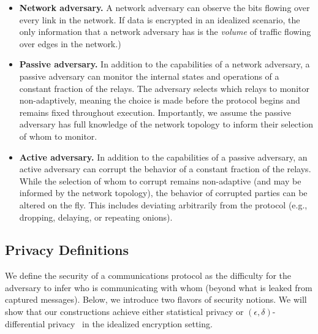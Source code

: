 \begin{itemize}
    \item \textbf{Network adversary.} A network adversary can observe the bits flowing over every link in the network. If data is encrypted in an idealized scenario, the only information that a network adversary has is the \textit{volume} of traffic flowing over edges in the network.)\\
    
    \item \textbf{Passive adversary.} In addition to the capabilities of a network adversary, a passive adversary can monitor the internal states and operations of a constant fraction of the relays. The adversary selects which relays to monitor non-adaptively, meaning the choice is made before the protocol begins and remains fixed throughout execution. Importantly, we assume the passive adversary has full knowledge of the network topology to inform their selection of whom to monitor.\\
    
    \item \textbf{Active adversary.} In addition to the capabilities of a passive adversary, an active adversary can corrupt the behavior of a constant fraction of the relays. While the selection of whom to corrupt remains non-adaptive (and may be informed by the network topology), the behavior of corrupted parties can be altered on the fly. This includes deviating arbitrarily from the protocol (e.g., dropping, delaying, or repeating onions). \\
\end{itemize}

\subsection{Privacy Definitions}

We define the security of a communications protocol as the difficulty for the adversary to infer who is communicating with whom (beyond what is leaked from captured messages). Below, we introduce two flavors of security notions. We will show that our constructions achieve either statistical privacy or $(\epsilon,\delta)$-differential privacy~\cite{TCC:DMNS06} in the idealized encryption setting.\\

